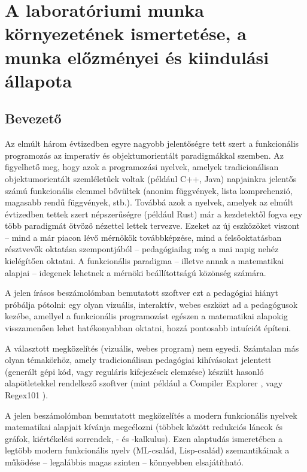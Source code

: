 \documentclass[a4paper,oneside,12pt]{article}
\begin{document}
\section{A laboratóriumi munka környezetének ismertetése,
  a munka előzményei és kiindulási állapota}
\label{sec:kornyezet}
\subsection{Bevezető}
\label{sec:bevezeto}

Az elmúlt három évtizedben egyre nagyobb jelentőségre tett szert a funkcionális programozás az imperatív és objektumorientált paradigmákkal szemben. Az figyelhető meg, hogy azok a programozási nyelvek, amelyek tradicionálisan objektumorientált szemléletűek voltak (például C++, Java) napjainkra jelentős számú funkcionális elemmel bővültek (anonim függvények, lista komprehenzió, magasabb rendű függvények, stb.). Továbbá azok a nyelvek, amelyek az elmúlt évtizedben tettek szert népszerűségre (például Rust) már a kezdetektől fogva egy több paradigmát ötvöző nézettel lettek tervezve. Ezeket az új eszközöket viszont -- mind a már piacon lévő mérnökök továbbképzése, mind a felsőoktatásban résztvevők oktatása szempontjából -- pedagógiailag még a mai napig nehéz kielégítően oktatni. A funkcionális paradigma -- illetve annak a matematikai alapjai -- idegenek lehetnek a mérnöki beállítottságú közönség számára.

A jelen írásos beszámolómban bemutatott szoftver ezt a pedagógiai hiányt próbálja pótolni: egy olyan vizuális, interaktív, webes eszközt ad a pedagógusok kezébe, amellyel a funkcionális programozást egészen a matematikai alapokig visszamenően lehet hatékonyabban oktatni, hozzá pontosabb intuíciót építeni.

A választott megközelítés (vizuális, webes program) nem egyedi. Számtalan más olyan témakörhöz, amely tradicionálisan pedagógiai kihívásokat jelentett (generált gépi kód, vagy reguláris kifejezések elemzése) készült hasonló alapötletekkel rendelkező szoftver (mint például a Compiler Explorer \cite{godboltCompilerExplorer}, vagy Regex101 \cite{dibRegex101BuildTest}).

A jelen beszámolómban bemutatott megközelítés a modern funkcionális nyelvek matematikai alapjait kívánja megcélozni (többek között redukciós láncok és gráfok, kiértékelési sorrendek, \lam- és \ski-kalkulus). Ezen alaptudás ismeretében a legtöbb modern funkcionális nyelv (ML-család, Lisp-család) szemantikáinak a működése -- legalábbis magas szinten -- könnyebben elsajátítható.
\end{document}
